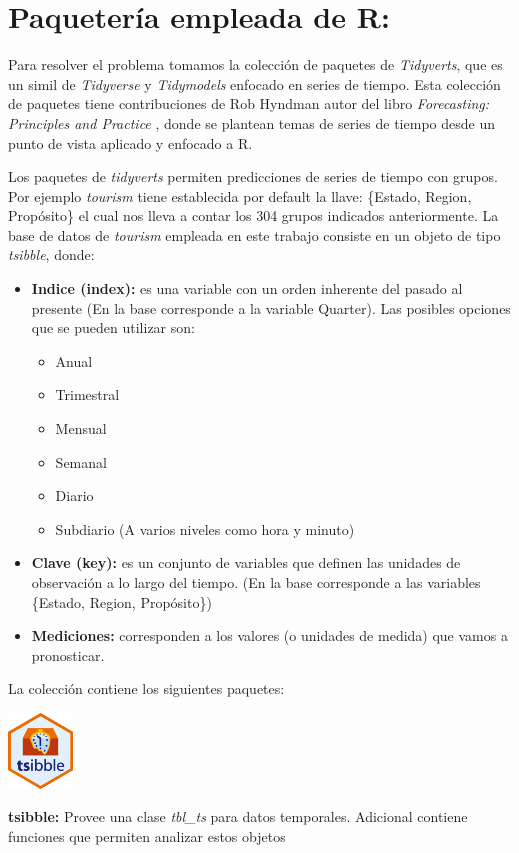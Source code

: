 \section{Paquetería empleada de R:}

Para resolver el problema tomamos la colección de paquetes de \textit{Tidyverts}, que es un simil de \textit{Tidyverse} y \textit{Tidymodels} enfocado en series de tiempo. Esta colección de paquetes tiene contribuciones de Rob Hyndman autor del libro \textit{Forecasting: Principles and Practice} \cite{hyndman2018forecasting}, donde se plantean temas de series de tiempo desde un punto de vista aplicado y enfocado a R. 

Los paquetes de \textit{tidyverts} permiten predicciones de series de tiempo con grupos. Por ejemplo \textit{tourism} tiene establecida por default la llave: \{Estado, Region, Propósito\} el cual nos lleva a contar los 304 grupos indicados anteriormente. La base de datos de \textit{tourism} empleada en este trabajo consiste en un objeto de tipo \textit{tsibble}, donde: 

\begin{itemize}
    \item \textbf{Indice (index):} es una variable con un orden inherente del pasado al presente (En la base corresponde a la variable Quarter). Las posibles opciones que se pueden utilizar son:
    \begin{itemize}
    \item Anual
    \item Trimestral
    \item Mensual
    \item Semanal
    \item Diario
    \item Subdiario (A varios niveles como hora y minuto)
\end{itemize}
    \item \textbf{Clave (key):} es un conjunto de variables que definen las unidades de observación a lo largo del tiempo. (En la base corresponde a las variables \{Estado, Region, Propósito\})
    \item \textbf{Mediciones:} corresponden a los valores (o unidades de medida) que vamos a pronosticar.
\end{itemize}

La colección contiene los siguientes paquetes:

\begin{minipage}{0.1\textwidth}
\hspace{\fill} 
\end{minipage}
\begin{minipage}{0.3\textwidth}
\includegraphics[height=2cm]{imgs/tsibble.png}
\end{minipage}
\begin{minipage}{0.5\textwidth}
\textbf{tsibble:}  Provee una clase \textit{tbl\_ts} para datos temporales. Adicional contiene funciones que permiten analizar estos objetos
\end{minipage}

